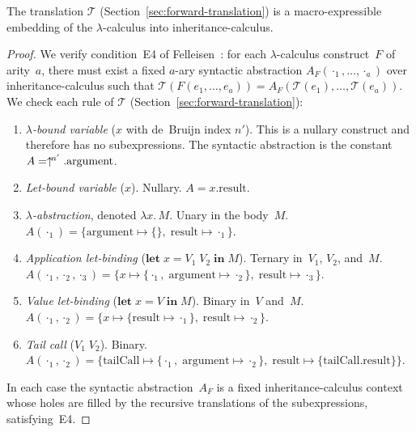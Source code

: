 \begin{theorem}
  \label{thm:forward-macro}
  The translation $\mathcal{T}$
  (Section~\ref{sec:forward-translation}) is a macro-expressible
  embedding of the $\lambda$-calculus into inheritance-calculus.
\end{theorem}

\begin{proof}
  We verify condition~E4 of
  Felleisen~\cite[Definition~3.11]{felleisen1991-expressive-power}:
  for each $\lambda$-calculus construct~$F$ of arity~$a$,
  there must exist a fixed $a$-ary syntactic abstraction
  $A_F(\cdot_1,\ldots,\cdot_a)$ over
  inheritance-calculus such that
  $\mathcal{T}(F(e_1,\ldots,e_a)) =
  A_F(\mathcal{T}(e_1),\ldots,\mathcal{T}(e_a))$.
  We check each rule of $\mathcal{T}$
  (Section~\ref{sec:forward-translation}):
  \begin{enumerate}
    \item \emph{$\lambda$-bound variable}
      ($x$ with de~Bruijn index $n'$).
      This is a nullary construct and therefore has no subexpressions.
      The syntactic abstraction is the constant
      $A = \uparrow^{\!n'}.\mathrm{argument}$.
    \item \emph{Let-bound variable} ($x$).
      Nullary.
      $A = x.\mathrm{result}$.
    \item \emph{$\lambda$-abstraction}, denoted $\lambda x.\, M$.
      Unary in the body~$M$.
      $A(\cdot_1) = \{\mathrm{argument} \mapsto \{\},\;
      \mathrm{result} \mapsto \cdot_1\}$.
    \item \emph{Application let-binding}
      ($\mathbf{let}\; x = V_1\; V_2
      \;\mathbf{in}\; M$).
      Ternary in~$V_1$, $V_2$, and~$M$.
      $A(\cdot_1, \cdot_2, \cdot_3) =
      \{x \mapsto \{\cdot_1,\;
        \mathrm{argument} \mapsto \cdot_2\},\;
      \mathrm{result} \mapsto \cdot_3\}$.
    \item \emph{Value let-binding}
      ($\mathbf{let}\; x = V \;\mathbf{in}\; M$).
      Binary in~$V$ and~$M$.
      $A(\cdot_1, \cdot_2) =
      \{x \mapsto \{\mathrm{result} \mapsto \cdot_1\},\;
      \mathrm{result} \mapsto \cdot_2\}$.
    \item \emph{Tail call} ($V_1\; V_2$).
      Binary.\newline
      $A(\cdot_1, \cdot_2) =
      \{\mathrm{tailCall} \mapsto
        \{\cdot_1,\;
        \mathrm{argument} \mapsto \cdot_2\},\;
        \mathrm{result} \mapsto
      \{\mathrm{tailCall}.\mathrm{result}\}\}$.
  \end{enumerate}
  In each case the syntactic abstraction~$A_F$ is a fixed
  inheritance-calculus context whose holes are filled
  by the recursive translations of the subexpressions,
  satisfying~E4.
\end{proof}

